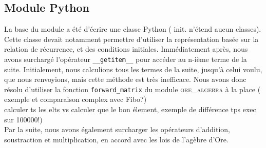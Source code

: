 \documentclass[12pt]{article}
\begin{document}
    \subsection{Module Python}
        \label{ssec:py}
        La base du module a été d'écrire une classe Python ({\color{red} init. n'étend aucun classes}). Cette classe devait notamment permettre
        d'utiliser la représentation basée sur la relation de récurrence, et des conditions initiales.
        Immédiatement après, nous avons surchargé l'opérateur \texttt{\_\_getitem\_\_} pour accéder
        au n-ième terme de la suite. Initialement, nous calculions tous les termes de la suite, jusqu'à 
        celui voulu, que nous renvoyions, mais cette méthode est très inefficace. Nous avons donc résolu
        d'utiliser la fonction \texttt{forward\_matrix} du module \textsc{ore\_algebra} à la place ({\color{red} exemple
        et comparaison complex avec Fibo?}) 
        \\{\color{red}calculer ts les elts vs calculer que le bon élement, exemple de différence tps exec sur 100000!})\\
        Par la suite, nous avons également surcharger les opérateurs d'addition, soustraction et multiplication, 
        en accord avec les lois de l'agèbre d'Ore.

\end{document}

